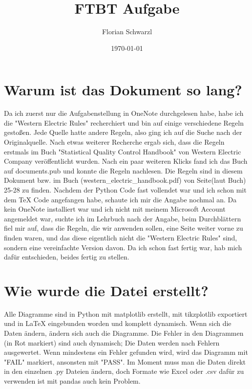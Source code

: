 \documentclass[12pt]{article}
\title{FTBT Aufgabe}
\author{Florian Schwarzl}
\date{\today}
\begin{document}
\maketitle

\newpage

\section{Warum ist das Dokument so lang?}

Da ich zuerst nur die Aufgabenstellung in OneNote durchgelesen habe, habe ich die "Western Electric Rules" recherchiert und bin auf einige verschiedene Regeln gestoßen. Jede Quelle hatte andere Regeln, also ging ich auf die Suche nach der Originalquelle. Nach etwas weiterer Recherche ergab sich, dass die Regeln erstmals im Buch "Statistical Quality Control Handbook" von Western Electric Company veröffentlicht wurden. Nach ein paar weiteren Klicks fand ich das Buch auf documents.pub und konnte die Regeln nachlesen. Die Regeln sind in diesem Dokument bzw. im Buch (western\_electric\_handbook.pdf) von Seite(laut Buch) 25-28 zu finden. Nachdem der Python Code fast vollendet war und ich schon mit dem TeX Code angefangen habe, schaute ich mir die Angabe nochmal an. Da kein OneNote installiert war und ich nicht mit meinem Microsoft Account angemeldet war, suchte ich im Lehrbuch nach der Angabe, beim Durchblättern fiel mir auf, dass die Regeln, die wir anwenden sollen, eine Seite weiter vorne zu finden waren, und das diese eigentlich nicht die "Western Electric Rules" sind, sondern eine vereinfachte Version davon. Da ich schon fast fertig war, hab mich dafür entschieden, beides fertig zu stellen.

\section{Wie wurde die Datei erstellt?}

Alle Diagramme sind in Python mit matplotlib erstellt, mit tikzplotlib exportiert und in LaTeX eingebunden worden und komplett dynamisch. Wenn sich die Daten ändern, ändern sich auch die Diagramme. Die Fehler in den Diagrammen (in Rot markiert) sind auch dynamisch; Die Daten werden nach Fehlern ausgewertet. Wenn mindestens ein Fehler gefunden wird, wird das Diagramm mit "FAIL" markiert, ansonsten mit "PASS". Im Moment muss man die Daten direkt in den einzelnen .py Dateien ändern, doch Formate wie Excel oder .csv dafür zu verwenden ist mit pandas auch kein Problem.
\end{document}
